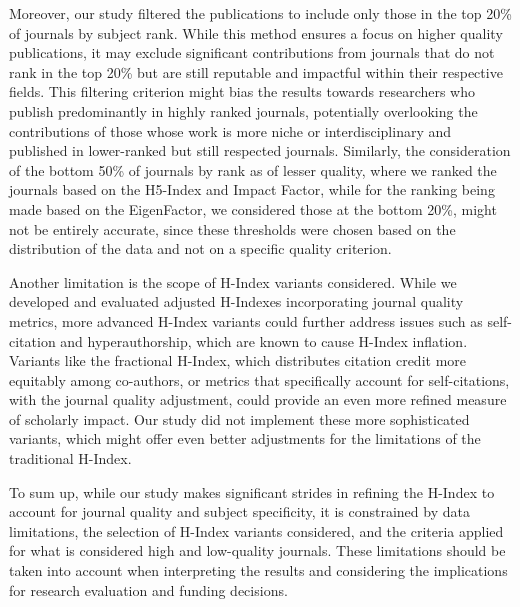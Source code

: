 Moreover, our study filtered the publications to include only those in the top
20\% of journals by subject rank. While this method ensures a focus on higher
quality publications, it may exclude significant contributions from journals
that do not rank in the top 20\% but are still reputable and impactful within
their respective fields. This filtering criterion might bias the results
towards researchers who publish predominantly in highly ranked journals,
potentially overlooking the contributions of those whose work is more niche or
interdisciplinary and published in lower-ranked but still respected journals.
Similarly, the consideration of the bottom 50\% of journals by rank as of
lesser quality, where we ranked the journals based on the H5-Index and Impact
Factor, while for the ranking being made based on the EigenFactor, we
considered those at the bottom 20\%, might not be entirely accurate, since
these thresholds were chosen based on the distribution of the data and not on a
specific quality criterion. %

Another limitation is the scope of H-Index variants considered. While we
developed and evaluated adjusted H-Indexes incorporating journal quality
metrics, more advanced H-Index variants could further address issues such as
self-citation and hyperauthorship, which are known to cause H-Index inflation.
Variants like the fractional H-Index, which distributes citation credit more
equitably among co-authors, or metrics that specifically account for
self-citations, with the journal quality adjustment, could provide an even more
refined measure of scholarly impact. Our study did not implement these more
sophisticated variants, which might offer even better adjustments for the
limitations of the traditional H-Index.

To sum up, while our study makes significant strides in refining the H-Index to
account for journal quality and subject specificity, it is constrained by data
limitations, the selection of H-Index variants considered, and the criteria
applied for what is considered high and low-quality journals. These limitations
should be taken into account when interpreting the results and considering the
implications for research evaluation and funding decisions.
